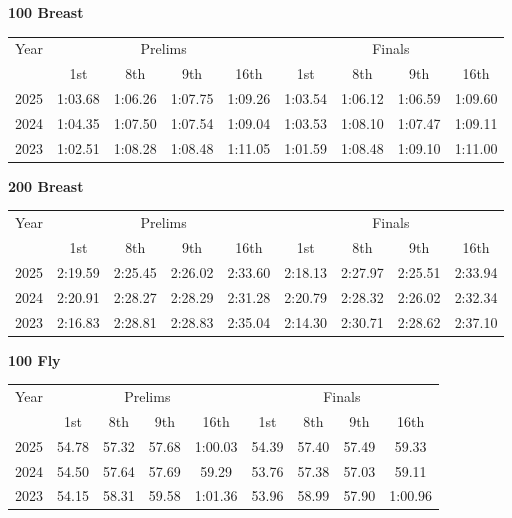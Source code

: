 \clearpage
\textbf{100 Breast}

\begin{flushleft}
\begin{tabular}{|c|c|c|c|c|c|c|c|c|}
\hline
Year & \multicolumn{4}{c|}{Prelims} & \multicolumn{4}{c|}{Finals} \\
\cline{2-9}
& 1st & 8th & 9th & 16th & 1st & 8th & 9th & 16th \\
\hline
2025 & 1:03.68 & 1:06.26 & 1:07.75 & 1:09.26 & 1:03.54 & 1:06.12 & 1:06.59 & 1:09.60 \\
2024 & 1:04.35 & 1:07.50 & 1:07.54 & 1:09.04 & 1:03.53 & 1:08.10 & 1:07.47 & 1:09.11 \\
2023 & 1:02.51 & 1:08.28 & 1:08.48 & 1:11.05 & 1:01.59 & 1:08.48 & 1:09.10 & 1:11.00 \\
\hline
\end{tabular}
\end{flushleft}

\textbf{200 Breast}

\begin{flushleft}
\begin{tabular}{|c|c|c|c|c|c|c|c|c|}
\hline
Year & \multicolumn{4}{c|}{Prelims} & \multicolumn{4}{c|}{Finals} \\
\cline{2-9}
& 1st & 8th & 9th & 16th & 1st & 8th & 9th & 16th \\
\hline
2025 & 2:19.59 & 2:25.45 & 2:26.02 & 2:33.60 & 2:18.13 & 2:27.97 & 2:25.51 & 2:33.94 \\
2024 & 2:20.91 & 2:28.27 & 2:28.29 & 2:31.28 & 2:20.79  & 2:28.32 & 2:26.02 & 2:32.34  \\
2023 & 2:16.83 & 2:28.81 & 2:28.83 & 2:35.04 & 2:14.30 & 2:30.71 & 2:28.62 & 2:37.10 \\
\hline
\end{tabular}
\end{flushleft}

\textbf{100 Fly}

\begin{flushleft}
\begin{tabular}{|c|c|c|c|c|c|c|c|c|}
\hline
Year & \multicolumn{4}{c|}{Prelims} & \multicolumn{4}{c|}{Finals} \\
\cline{2-9}
& 1st & 8th & 9th & 16th & 1st & 8th & 9th & 16th \\
\hline
2025 & 54.78 & 57.32 & 57.68 & 1:00.03 & 54.39 & 57.40 & 57.49 & 59.33 \\
2024 & 54.50 & 57.64 & 57.69 & 59.29 & 53.76 & 57.38 & 57.03 & 59.11 \\
2023 & 54.15 & 58.31 & 59.58 & 1:01.36 & 53.96 & 58.99 & 57.90 & 1:00.96 \\
\hline
\end{tabular}
\end{flushleft}

